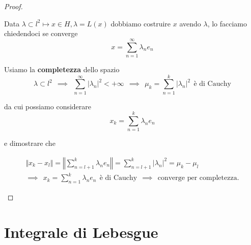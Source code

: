 \begin{proof}
\begin{itemize}
Data $\lambda \subset l^{2} \mapsto x\in H, \lambda = L(x)$ dobbiamo costruire $x$ avendo $\lambda $, lo facciamo chiedendoci se converge
\begin{equation*}
x = \sum^{\infty}_{n = 1} \lambda_{n} e_{n}
\end{equation*}

Usiamo la \textbf{completezza} dello spazio
\begin{equation*}
\lambda \subset l^{2} \ \ \implies \ \ \sum\limits^{\infty}_{n = 1}| \lambda_{n}|^{2} < + \infty \ \ \implies \ \ \mu_{k} = \sum\limits^{k}_{n = 1}| \lambda_{n}|^{2} \ \ \text{è di Cauchy}
\end{equation*}

da cui possiamo considerare
\begin{equation*}
x_{k} = \sum^{k}_{n = 1} \lambda_{n} e_{n}
\end{equation*}

e dimostrare che

\begin{gather*}
\Vert x_{k} - x_{l} \Vert = \left \Vert \sum\limits^{k}_{n = l + 1} \lambda_{n} e_{n}\right \Vert = \sum\limits^{k}_{n = l + 1}| \lambda_{n}|^{2} = \mu_{k} - \mu_{l}\\
\implies \ \ x_{k} = \sum^{k}_{n = 1} \lambda_{n} e_{n} \ \ \text{è di Cauchy} \ \ \implies \ \ \text{converge per completezza.}
\end{gather*}

\end{itemize}
\end{proof}

\section{Integrale di Lebesgue}

